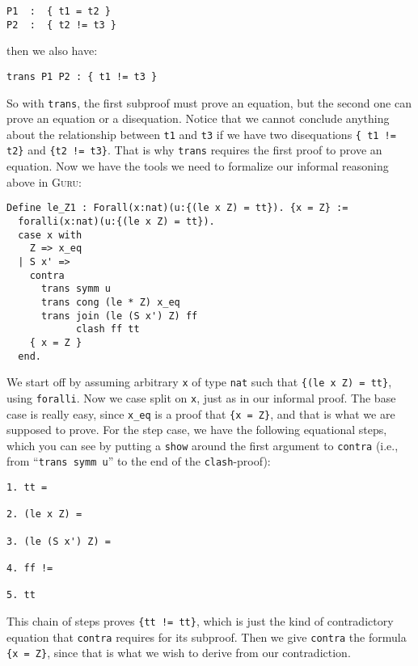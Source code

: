 \documentclass{book}[12pt]
\newcommand{\guru}[0]{\textsc{Guru}\xspace}
\begin{document}
\begin{verbatim}
P1  :  { t1 = t2 }
P2  :  { t2 != t3 }
\end{verbatim}

\noindent then we also have:

\begin{verbatim}
trans P1 P2 : { t1 != t3 }
\end{verbatim}

\noindent So with \texttt{trans}, the first subproof must prove an
equation, but the second one can prove an equation or a disequation.
Notice that we cannot conclude anything about the relationship between
\texttt{t1} and \texttt{t3} if we have two disequations \texttt{\{ t1
!= t2\}} and \texttt{\{t2 != t3\}}.  That is why \texttt{trans}
requires the first proof to prove an equation.  Now we have the tools
we need to formalize our informal reasoning above in \guru:

\begin{verbatim}
Define le_Z1 : Forall(x:nat)(u:{(le x Z) = tt}). {x = Z} :=
  foralli(x:nat)(u:{(le x Z) = tt}).
  case x with
    Z => x_eq
  | S x' => 
    contra 
      trans symm u
      trans cong (le * Z) x_eq
      trans join (le (S x') Z) ff
            clash ff tt
    { x = Z }
  end.
\end{verbatim}

\noindent We start off by assuming arbitrary \texttt{x} of type
\texttt{nat} such that \texttt{\{(le x Z) = tt\}}, using
\texttt{foralli}.  Now we case split on \texttt{x}, just as in our
informal proof.  The base case is really easy, since \texttt{x\_eq} is
a proof that \texttt{\{x = Z\}}, and that is what we are supposed to
prove.  For the step case, we have the following equational steps,
which you can see by putting a \texttt{show} around the first
argument to \texttt{contra} (i.e., from ``\texttt{trans symm u}'' to the
end of the \texttt{clash}-proof):

\begin{verbatim}
1. tt =

2. (le x Z) =

3. (le (S x') Z) =

4. ff !=

5. tt
\end{verbatim}

\noindent This chain of steps proves \texttt{\{tt != tt\}}, which is
just the kind of contradictory equation that \texttt{contra} requires
for its subproof.  Then we give \texttt{contra} the formula
\texttt{\{x = Z\}}, since that is what we wish to derive from our
contradiction.
\end{document}
